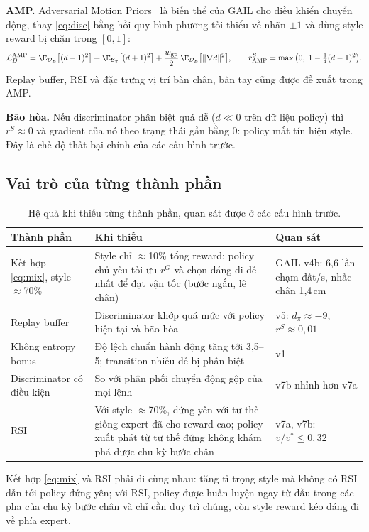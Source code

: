 \textbf{AMP.} Adversarial Motion Priors~\cite{peng2021amp} là biến thể của GAIL cho điều
khiển chuyển động, thay \eqref{eq:disc} bằng hồi quy bình phương tối thiểu về nhãn $\pm 1$
và dùng style reward bị chặn trong $[0, 1]$:
\begin{equation}
  \mathcal{L}_D^\text{AMP} = \E_{\mathcal{D}_E}\big[(d - 1)^2\big]
  + \E_{\mathcal{B}_\pi}\big[(d + 1)^2\big] + \frac{w_\text{gp}}{2}\,
  \E_{\mathcal{D}_E}\big[\|\nabla d\|^2\big],
  \qquad
  r^S_\text{AMP} = \max\big(0,\; 1 - \tfrac14 (d - 1)^2\big).
  \label{eq:amp}
\end{equation}
Replay buffer, RSI và đặc trưng vị trí bàn chân, bàn tay cũng được đề xuất trong AMP.

\textbf{Bão hòa.} Nếu discriminator phân biệt quá dễ ($d \ll 0$ trên dữ liệu policy) thì
$r^S \approx 0$ và gradient của nó theo trạng thái gần bằng 0: policy mất tín hiệu style.
Đây là chế độ thất bại chính của các cấu hình trước.

\subsection{Vai trò của từng thành phần}
\begin{table}[H]
\centering
\caption{Hệ quả khi thiếu từng thành phần, quan sát được ở các cấu hình trước.}
\label{tab:roles}
\small
\begin{tabular}{@{}p{3.0cm}p{6.8cm}p{3.9cm}@{}}
\toprule
Thành phần & Khi thiếu & Quan sát \\
\midrule
Kết hợp \eqref{eq:mix}, style $\approx$70\% & Style chỉ $\approx$10\% tổng reward; policy
chủ yếu tối ưu $r^G$ và chọn dáng đi dễ nhất để đạt vận tốc (bước ngắn, lê chân) &
GAIL v4b: 6,6 lần chạm đất/s, nhấc chân 1,4\,cm \\
Replay buffer & Discriminator khớp quá mức với policy hiện tại và bão hòa & v5:
$\bar d_\pi \approx -9$, $r^S \approx 0{,}01$ \\
Không entropy bonus & Độ lệch chuẩn hành động tăng tới 3,5--5; transition nhiễu dễ bị
phân biệt & v1 \\
Discriminator có điều kiện & So với phân phối chuyển động gộp của mọi lệnh & v7b nhỉnh
hơn v7a \\
RSI & Với style $\approx$70\%, đứng yên với tư thế giống expert đã cho reward cao; policy
xuất phát từ tư thế đứng không khám phá được chu kỳ bước chân & v7a, v7b: $v/v^* \le
0{,}32$ \\
\bottomrule
\end{tabular}
\end{table}
Kết hợp \eqref{eq:mix} và RSI phải đi cùng nhau: tăng tỉ trọng style mà không có RSI dẫn
tới policy đứng yên; với RSI, policy được huấn luyện ngay từ đầu trong các pha của chu kỳ
bước chân và chỉ cần duy trì chúng, còn style reward kéo dáng đi về phía expert.

